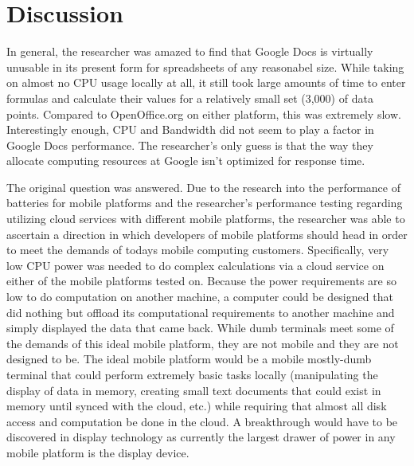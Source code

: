 \section{Discussion}

In general, the researcher was amazed to find that Google Docs is virtually
unusable in its present form for spreadsheets of any reasonabel size.  While
taking on almost no CPU usage locally at all, it still took large amounts of
time to enter formulas and calculate their values for a relatively small set
(3,000) of data points.  Compared to OpenOffice.org on either platform, this was
extremely slow.  Interestingly enough, CPU and Bandwidth did not seem to play a
factor in Google Docs performance.  The researcher's only guess is that the way
they allocate computing resources at Google isn't optimized for response time.


The original question was answered.  Due to the research into the performance of
batteries for mobile platforms and the researcher's performance testing
regarding utilizing cloud services with different mobile platforms, the
researcher was able to ascertain a direction in which developers of mobile
platforms should head in order to meet the demands of todays mobile computing
customers.  Specifically, very low CPU power was needed to do complex
calculations via a cloud service on either of the mobile platforms tested on.
Because the power requirements are so low to do computation on another machine,
a computer could be designed that did nothing but offload its computational
requirements to another machine and simply displayed the data that came back.
While dumb terminals meet some of the demands of this ideal mobile platform,
they are not mobile and they are not designed to be.  The ideal mobile platform
would be a mobile mostly-dumb terminal that could perform extremely basic tasks
locally (manipulating the display of data in memory, creating small text
documents that could exist in memory until synced with the cloud, etc.) while
requiring that almost all disk access and computation be done in the cloud.  A
breakthrough would have to be discovered in display technology as currently the
largest drawer of power in any mobile platform is the display device.

